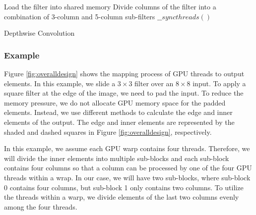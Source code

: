 \begin{algorithm}[t!]
\small
	Load the filter into shared memory\;
	Divide columns of the filter into a combination of 3-column and 5-column sub-filters\;
	$\_\_syncthreads()$\;
	\caption{Depthwise Convolution}
	\label{algo:overalldesign}
\end{algorithm}

\subsubsection{Example} Figure \ref{fig:overalldesign} shows the mapping process of GPU threads to output elements. In this example, we slide a $3
\times 3$ filter over an $8 \times 8$ input. To apply a square  filter at the edge of the image, we need to pad the input. To reduce the
memory pressure, we do not allocate GPU memory space for the padded elements. Instead, we use different methods to calculate the edge and
inner elements of the output. The edge and inner elements are represented by the shaded and dashed squares in Figure
\ref{fig:overalldesign}, respectively.


In this example, we assume each GPU warp contains four threads. Therefore, we will divide the inner elements into multiple sub-blocks and
each sub-block contains four columns so that a column can be processed by one of the four GPU threads within a wrap. In our case, we will
have two sub-blocks, where sub-block 0 contains four columns, but sub-block 1 only contains two columns. To utilize the threads within a
warp, we divide elements of the last two columns evenly among the four threads.


